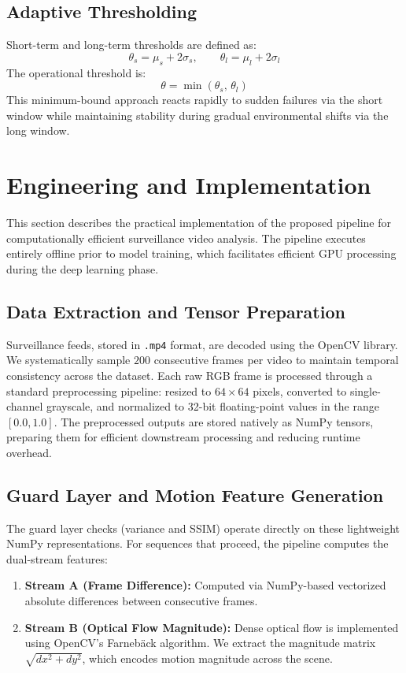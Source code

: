 \documentclass[runningheads]{llncs}
\begin{document}
\subsection{Adaptive Thresholding}
Short-term and long-term thresholds are defined as:
\begin{equation}
\theta_s = \mu_s + 2\sigma_s, \qquad \theta_l = \mu_l + 2\sigma_l
\label{eq:thresh}
\end{equation}
The operational threshold is:
\begin{equation}
\theta = \min(\theta_s,\,\theta_l)
\label{eq:minthresh}
\end{equation}
This minimum-bound approach reacts rapidly to sudden failures via the
short window while maintaining stability during gradual environmental
shifts via the long window.

\section{Engineering and Implementation}
This section describes the practical implementation of the proposed pipeline for computationally efficient surveillance video analysis. The pipeline executes entirely offline prior to model training, which facilitates efficient GPU processing during the deep learning phase.

\subsection{Data Extraction and Tensor Preparation}
Surveillance feeds, stored in \texttt{.mp4} format, are decoded using the OpenCV library. We systematically sample $200$ consecutive frames per video to maintain temporal consistency across the dataset. Each raw RGB frame is processed through a standard preprocessing pipeline: resized to $64\times64$ pixels, converted to single-channel grayscale, and normalized to 32-bit floating-point values in the range $[0.0, 1.0]$. The preprocessed outputs are stored natively as NumPy tensors, preparing them for efficient downstream processing and reducing runtime overhead.

\subsection{Guard Layer and Motion Feature Generation}
The guard layer checks (variance and SSIM) operate directly on these lightweight NumPy representations. For sequences that proceed, the pipeline computes the dual-stream features:
\begin{enumerate}
    \item \textbf{Stream A (Frame Difference):} Computed via NumPy-based vectorized absolute differences between consecutive frames.
    \item \textbf{Stream B (Optical Flow Magnitude):} Dense optical flow is implemented using OpenCV's Farnebäck algorithm. We extract the magnitude matrix $\sqrt{dx^2 + dy^2}$, which encodes motion magnitude across the scene.
\end{enumerate}
\end{document}
